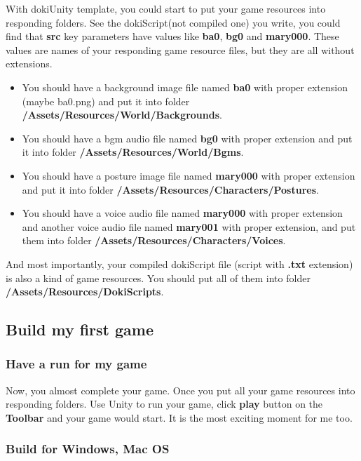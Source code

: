 With dokiUnity template, you could start to put your game resources into responding folders. See the dokiScript(not compiled one) you write, you could find that \textbf{src} key parameters have values like \textbf{ba0}, \textbf{bg0} and \textbf{mary000}. These values are names of your responding game resource files, but they are all without extensions. 
\begin{itemize}
	\item You should have a background image file named \textbf{ba0} with proper extension (maybe ba0.png) and put it into folder \textbf{/Assets/Resources/World/Backgrounds}. 
	\item You should have a bgm audio file named \textbf{bg0} with proper extension and put it into folder \textbf{/Assets/Resources/World/Bgms}. 
	\item You should have a posture image file named \textbf{mary000} with proper extension and put it into folder \textbf{/Assets/Resources/Characters/Postures}.
	\item  You should have a voice audio file named \textbf{mary000} with proper extension and another voice audio file named \textbf{mary001} with proper extension, and put them into folder \textbf{/Assets/Resources/Characters/Voices}.
\end{itemize}

And most importantly, your compiled dokiScript file (script with \textbf{.txt} extension) is also a kind of game resources. You should put all of them into folder \textbf{/Assets/Resources/DokiScripts}.

\subsection{Build my first game}

\subsubsection{Have a run for my game}

Now, you almost complete your game. Once you put all your game resources into responding folders. Use Unity to run your game, click \textbf{play} button on the \textbf{Toolbar} and your game would start. It is the most exciting moment for me too.

\subsubsection{Build for Windows, Mac OS}

